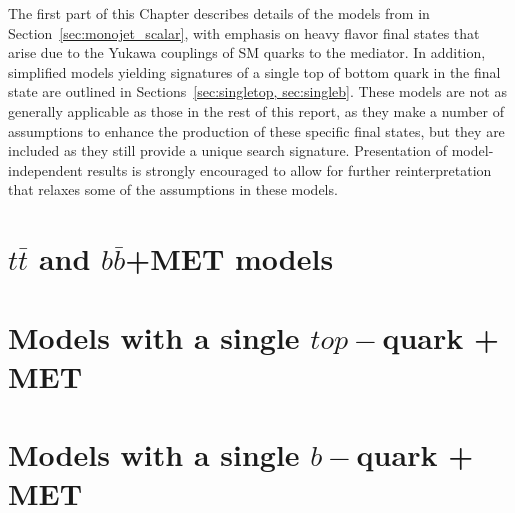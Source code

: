 
The first part of this Chapter describes details of the models from in Section~\ref{sec:monojet_scalar}, with 
emphasis on heavy flavor final states that arise due to the Yukawa couplings of SM quarks to the mediator. 
In addition, simplified models yielding signatures of a single top of bottom quark in the final state are outlined 
in Sections~\ref{sec:singletop, sec:singleb}. 
These models are not as generally applicable as those in the rest of this report, as they make a number of 
assumptions to enhance the production of these specific final states, but they are included as they still provide a 
unique search signature. Presentation of model-independent results is strongly encouraged to allow for further 
reinterpretation that relaxes some of the assumptions in these models.  

\section{\texorpdfstring{$t \bar{t}$ and $b \bar{b}$+MET models}{ttbar/bbbar+MET models}}



\section{\texorpdfstring{Models with a single $top-$quark + MET}{Models with a single top-quark + MET}}
\label{sec:singletop}

 
 \section{\texorpdfstring{Models with a single $b-$quark + MET}{Models with a single b-quark + MET}}
\label{sec:singleb}
 

